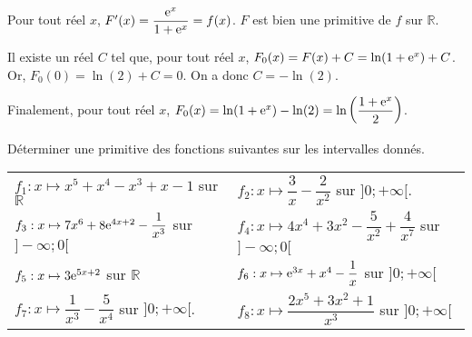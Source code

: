 \documentclass[11pt,fleqn, openany]{book} %
\begin{document}
\begin{solution}
 Pour tout réel \(x\), \(F'(x)=\dfrac{\mathrm{e}^x}{1+\mathrm{e}^x}=f(x)\). \(F\) est bien une primitive de \(f\) sur \(\mathbb{R}\).

Il existe un réel \(C\) tel que, pour tout réel \(x\), \(F_0(x)=F(x)+C=\ln(1+\mathrm{e}^x)+C\). Or, \(F_0(0)=\ln(2)+C=0\). On a donc \(C=-\ln(2)\). 

Finalement, pour tout réel \(x\), \(F_0(x)=\ln(1+\mathrm{e}^x)-\ln(2)=\ln\left(\dfrac{1+\mathrm{e}^x}{2}\right)\).

 \end{solution}





\begin{exercise}Déterminer une primitive des fonctions suivantes sur les intervalles donnés.

\renewcommand{\arraystretch}{2}
\begin{tabularx}{\linewidth}{XX}
 $f_1 : x\mapsto x^5 + x^4 - x^3 + x -1$ sur $\mathbb{R}$
&
 $f_2:x \mapsto \dfrac{3}{x}-\dfrac{2}{x^2}$ sur $]0;+\infty[$.
\\
 $f_3:x \mapsto 7x^6+8\mathrm{e}^{4x+2}-\dfrac{1}{x^3}$ sur $]-\infty;0[$
&
 $f_4:x\mapsto 4x^4+3x^2-\dfrac{5}{x^2}+\dfrac{4}{x^7}$ sur $]-\infty;
0[$
\\
 $f_5:x\mapsto 3\mathrm{e}^{5x+2}$ sur $\mathbb{R}$
&
$f_6:x\mapsto \mathrm{e}^{3x}+x^4-\dfrac{1}{x}$ sur $]0;+\infty[$
\\
 $f_7:x \mapsto \dfrac{1}{x^3}-\dfrac{5}{x^4}$ sur $]0;+\infty[$.
 &
 $f_8:x\mapsto \dfrac{2x^5+3x^2+1}{x^3}$ sur $]0;+\infty[$
\end{tabularx}\end{exercise}
\end{document}

